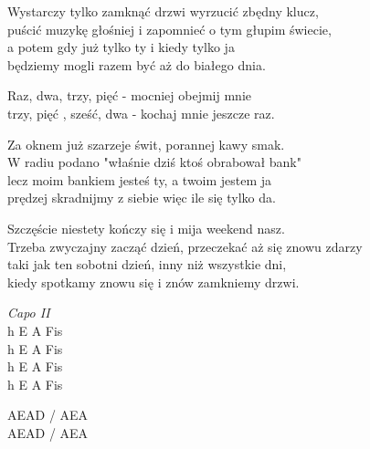 \begin{text}
    \hfill\break
    Wystarczy tylko zamknąć drzwi wyrzucić zbędny klucz,\\
    puścić muzykę głośniej i zapomnieć o tym głupim świecie,\\
    a potem gdy już tylko ty i kiedy tylko ja\\
    będziemy mogli razem być aż do białego dnia.

    Raz, dwa, trzy, pięć - mocniej obejmij mnie\\
    trzy, pięć , sześć, dwa - kochaj mnie jeszcze raz.

    Za oknem już szarzeje świt, porannej kawy smak.\\
    W radiu podano "właśnie dziś ktoś obrabował bank"\\
    lecz moim bankiem jesteś ty, a twoim jestem ja\\
    prędzej skradnijmy z siebie więc ile się tylko da.

    Szczęście niestety kończy się i mija weekend nasz.\\
    Trzeba zwyczajny zacząć dzień, przeczekać aż się znowu zdarzy\\
    taki jak ten sobotni dzień, inny niż wszystkie dni,\\
    kiedy spotkamy znowu się i znów zamkniemy drzwi.
\end{text}
\begin{chord}
    \textit{Capo II}\\
    h E A Fis\\
    h E A Fis\\
    h E A Fis\\
    h E A Fis

    AEAD / AEA\\
    AEAD / AEA
\end{chord}
